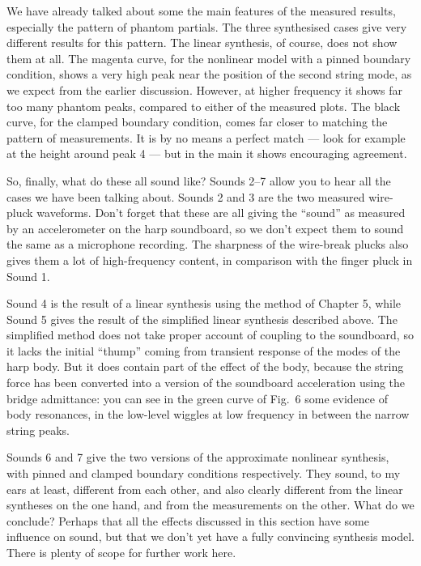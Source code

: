   We have already talked about some the main features of the measured results, 
  especially the pattern of phantom partials. The three synthesised cases give 
  very different results for this pattern. The linear synthesis, of course, 
  does not show them at all. The magenta curve, for the nonlinear model with a 
  pinned boundary condition, shows a very high peak near the position of the 
  second string mode, as we expect from the earlier discussion. However, at 
  higher frequency it shows far too many phantom peaks, compared to either of 
  the measured plots. The black curve, for the clamped boundary condition, 
  comes far closer to matching the pattern of measurements. It is by no means a 
  perfect match --- look for example at the height around peak 4 --- but in the 
  main it shows encouraging agreement. 

  So, finally, what do these all sound like? Sounds 2--7 allow you to hear all 
  the cases we have been talking about. Sounds 2 and 3 are the two measured 
  wire-pluck waveforms. Don't forget that these are all giving the ``sound'' as 
  measured by an accelerometer on the harp soundboard, so we don't expect them 
  to sound the same as a microphone recording. The sharpness of the wire-break 
  plucks also gives them a lot of high-frequency content, in comparison with 
  the finger pluck in Sound 1. 

  Sound 4 is the result of a linear synthesis using the method of Chapter 5, 
  while Sound 5 gives the result of the simplified linear synthesis described 
  above. The simplified method does not take proper account of coupling to the 
  soundboard, so it lacks the initial ``thump'' coming from transient response 
  of the modes of the harp body. But it does contain part of the effect of the 
  body, because the string force has been converted into a version of the 
  soundboard acceleration using the bridge admittance: you can see in the green 
  curve of Fig.\ 6 some evidence of body resonances, in the low-level wiggles 
  at low frequency in between the narrow string peaks. 

  Sounds 6 and 7 give the two versions of the approximate nonlinear synthesis, 
  with pinned and clamped boundary conditions respectively. They sound, to my 
  ears at least, different from each other, and also clearly different from the 
  linear syntheses on the one hand, and from the measurements on the other. 
  What do we conclude? Perhaps that all the effects discussed in this section 
  have some influence on sound, but that we don't yet have a fully convincing 
  synthesis model. There is plenty of scope for further work here. 

